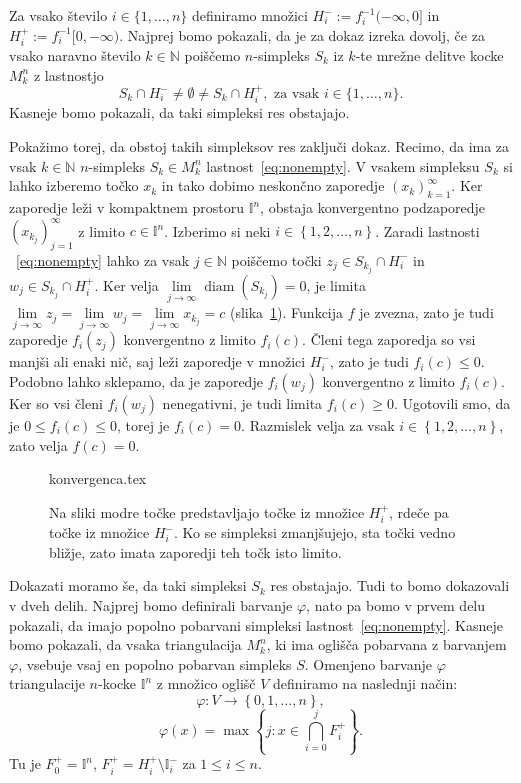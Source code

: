 \documentclass[mat1]{fmfdelo}
\newcommand{\N}{\mathbb N}
\DeclareMathOperator{\diam}{diam}
\newcommand{\I}{\mathbb I}
\newcommand{\0}{0}
\begin{document}
\begin{dokaz}
Za vsako število $i \in \{ 1, \dots, n\}$ definiramo množici $H_i^- := f_i^{-1} (-\infty, 0]$ in $H_i^+ := f_i^{-1} [0, -\infty)$. Najprej bomo pokazali, da je za dokaz izreka dovolj, če za vsako naravno število $k \in \N$ poiščemo $n$-simpleks $S_k$ iz $k$-te mrežne delitve kocke $M_k^n$ z lastnostjo 
\begin{equation}\label{eq:nonempty}
S_k \cap H_i^- \neq \emptyset \neq S_k \cap H_i^+, \text{ za vsak } i \in \{ 1, \dots, n \}.
\end{equation}
Kasneje bomo pokazali, da taki simpleksi res obstajajo.

Pokažimo torej, da obstoj takih simpleksov res zaključi dokaz. Recimo, da ima za vsak $k \in \N$ $n$-simpleks $S_k \in M_k^n$ lastnost~\eqref{eq:nonempty}. V vsakem simpleksu $S_k$ si lahko izberemo točko $x_k$ in tako dobimo neskončno zaporedje $\left ( x_k \right ) _{k = 1}^{\infty}$. Ker zaporedje leži v kompaktnem prostoru $\I^n$, obstaja konvergentno podzaporedje $\left ( x_{k_j} \right ) _{j = 1}^{\infty}$ z limito $c \in \I^n$. Izberimo si neki $i \in \left \{1, 2, \dots, n\right \}$. Zaradi lastnosti ~\eqref{eq:nonempty} lahko za vsak $j \in \N$ poiščemo točki $z_j \in S_{k_j} \cap H_i^-$ in $w_j \in S_{k_j} \cap H_i^+$. Ker velja $\lim\limits_{j \to \infty} \diam(S_{k_j}) = 0$, je limita  $\lim\limits_{j \to \infty} z_j = \lim\limits_{j \to \infty} w_j = \lim\limits_{j \to \infty} x_{k_j} = c$ (slika~\ref{fig:istalimita}). Funkcija $f$ je zvezna, zato je tudi zaporedje $f_i(z_j)$ konvergentno z limito $f_i(c)$. Členi tega zaporedja so vsi manjši ali enaki nič, saj leži zaporedje v množici $H_i^-$, zato je tudi $f_i(c) \leq 0$. Podobno lahko sklepamo, da je zaporedje $f_i(w_j)$ konvergentno z limito $f_i(c)$. Ker so vsi členi $f_i(w_j)$ nenegativni, je tudi limita $f_i(c) \geq 0$. Ugotovili smo, da je $0 \leq f_i(c) \leq 0$, torej je $f_i(c) = 0$. Razmislek velja za vsak $i \in \left \{1, 2, \dots, n\right \}$, zato velja $f(c) = \0$.
\begin{figure}[h!]
	\centering
	{konvergenca.tex}%
	\caption{Na sliki modre točke predstavljajo točke iz množice $H_i^+$, rdeče pa točke iz množice $H_i^-$. Ko se simpleksi zmanjšujejo, sta točki vedno bližje, zato imata zaporedji teh točk isto limito.}\label{fig:istalimita}
\end{figure}
Dokazati moramo še, da taki simpleksi $S_k$ res obstajajo. Tudi to bomo dokazovali v dveh delih. Najprej bomo definirali barvanje $\varphi$, nato pa bomo v prvem delu pokazali, da imajo popolno pobarvani simpleksi lastnost~\eqref{eq:nonempty}. Kasneje bomo pokazali, da vsaka triangulacija $M_k^n$, ki ima oglišča pobarvana z barvanjem $\varphi$, vsebuje vsaj en popolno pobarvan simpleks $S$.
Omenjeno barvanje $\varphi$ triangulacije $n$-kocke $\I^n$ z množico oglišč $V$ definiramo na naslednji način:
$$\varphi : V \to \left \{ 0, 1, \dots, n \right \},$$
$$\varphi(x) = \max \left \{ j : x \in \bigcap_{i=0}^j F_i^+\right \}.$$
Tu je $ F_0^+ = \I^n$, $ F_i^+ =  H_i^+ \setminus \I_i^-$ za $1 \leq i \leq n$.


\end{dokaz}
\end{document}
